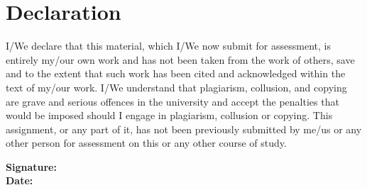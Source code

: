 \section*{Declaration}

I/We declare that this material, which I/We now submit for assessment, is entirely my/our own work and has not been taken from the work of others, save and to the extent that such work has been cited and acknowledged within the text of my/our work. I/We understand that plagiarism, collusion, and copying are grave and serious offences in the university and accept the penalties that would be imposed should I engage in plagiarism, collusion or copying. This assignment, or any part of it, has not been previously submitted by me/us or any other person for assessment on this or any other course of study.


\vspace{10pt}
\noindent\textbf{Signature:} \AuthorName \\
\vspace{5pt}\textbf{Date:} \CurriculumDate


\newpage